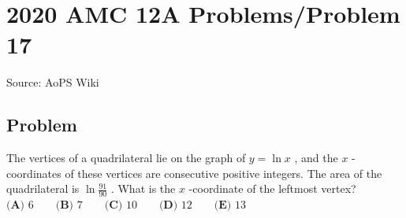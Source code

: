 \documentclass[12pt]{article}
\begin{document}
\section*{{2020 AMC 12A Problems/Problem 17}}
Source: AoPS Wiki

\subsection*{Problem}
The vertices of a quadrilateral lie on the graph of $y=\ln{x}$ , and the $x$ -coordinates of these vertices are consecutive positive integers. The area of the quadrilateral is $\ln{\frac{91}{90}}$ . What is the $x$ -coordinate of the leftmost vertex? $\textbf{(A) } 6 \qquad \textbf{(B) } 7 \qquad \textbf{(C) } 10 \qquad \textbf{(D) } 12 \qquad \textbf{(E) } 13$
\end{document}
